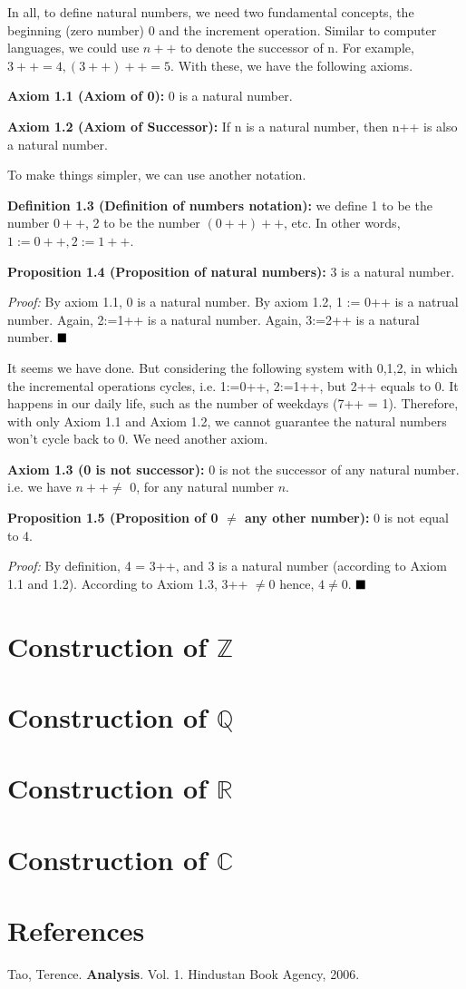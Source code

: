 \documentclass[12pt,openany]{book}
\theoremstyle{definition}
\theoremstyle{definition}
\begin{document}
In all, to define natural numbers, we need two fundamental concepts, the beginning (zero number) $0$ and the increment operation. Similar to computer languages, we could use $n++$ to denote the successor of n. For example, $3++ = 4, (3++)++ = 5$. With these, we have the following axioms.

\noindent\textbf{Axiom 1.1 (Axiom of 0):} 0 is a natural number.

\noindent\textbf{Axiom 1.2 (Axiom of Successor):} If n is a natural number, then n++ is also a natural number.

To make things simpler, we can use another notation.

\noindent\textbf{Definition 1.3 (Definition of numbers notation):} we define 1 to be the number $0++$, 2 to be the number $(0++)++$, etc. In other words, $1 := 0++, 2 := 1++$.

\noindent\textbf{Proposition 1.4 (Proposition of natural numbers):} 3 is a natural number.

\textit{Proof:} By axiom 1.1, 0 is a natural number. By axiom 1.2, 1 := 0++ is a natrual number. Again, 2:=1++ is a natural number. Again, 3:=2++ is a natural number. $\hfill\blacksquare$

It seems we have done. But considering the following system with 0,1,2, in which the incremental operations cycles, i.e. 1:=0++, 2:=1++, but 2++ equals to 0. It happens in our daily life, such as the number of weekdays (7++ = 1). Therefore, with only Axiom 1.1 and Axiom 1.2, we cannot guarantee the natural numbers won't cycle back to 0. We need another axiom.

\noindent\textbf{Axiom 1.3 (0 is not successor):} 0 is not the successor of any natural number. i.e. we have $ n++ \neq$ 0, for any natural number $n$.

\noindent\textbf{Proposition 1.5 (Proposition of 0 $\neq$ any other number):} 0 is not equal to 4.

\textit{Proof:} By definition, 4 = 3++, and 3 is a natural number (according to Axiom 1.1 and 1.2). According to Axiom 1.3, 3++ $\neq 0$ hence, $4 \neq 0$. $\hfill\blacksquare$

\chapter{Construction of $\mathbb{Z}$}

\chapter{Construction of $\mathbb{Q}$}

\chapter{Construction of $\mathbb{R}$}

\chapter{Construction of $\mathbb{C}$}

\chapter{References}

Tao, Terence. \textbf{Analysis}. Vol. 1. Hindustan Book Agency, 2006.
\end{document}
